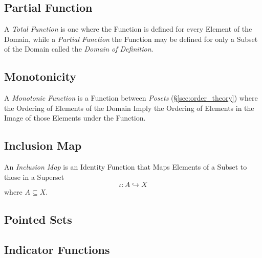 \documentclass{article}
\begin{document}
\subsection{Partial Function}\label{subsec:partial_function}

A \emph{Total Function} is one where the Function is defined for every
Element of the Domain, while a \emph{Partial Function} the Function
may be defined for only a Subset of the Domain called the \emph{Domain
  of Definition}.

\subsection{Monotonicity}\label{subsec:monotonicity}

A \emph{Monotonic Function} is a Function between \emph{Posets}
(\S\ref{sec:order_theory}) where the Ordering of Elements of the
Domain Imply the Ordering of Elements in the Image of those Elements
under the Function.

\subsection{Inclusion Map}\label{subsec:inclusion_map}

An \emph{Inclusion Map} is an Identity Function that Maps Elements of
a Subset to those in a Superset
\[
    \iota : A \hookrightarrow X
\]
where $A \subseteq X$.

\subsection{Pointed Sets}

\subsection{Indicator Functions}\label{subsec:indicator_function}
\end{document}
